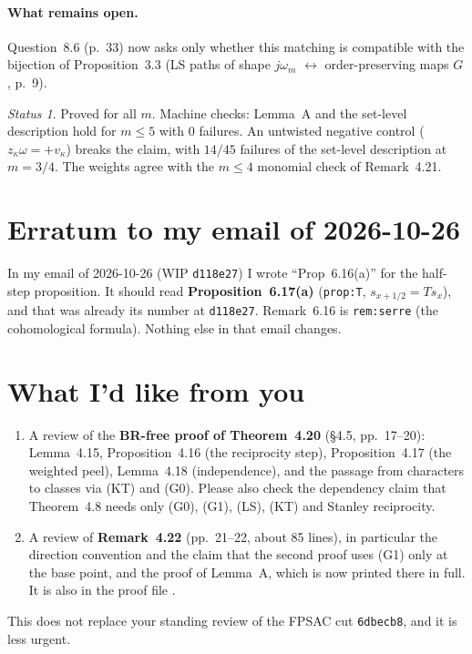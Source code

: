 \documentclass[11pt]{article}
\theoremstyle{plain}
\theoremstyle{remark}
\newtheorem*{status}{Status}
\begin{document}
\paragraph{What remains open.} Question~8.6 (p.~33) now asks only whether this matching is
compatible with the bijection of Proposition~3.3 (LS paths of shape $j\omega_m$ $\leftrightarrow$
order-preserving maps $G$, p.~9).

\begin{status}
Proved for all $m$. Machine checks: Lemma~A and the set-level description hold for $m\le5$ with
$0$ failures. An untwisted negative control ($z_\kappa\omega=+v_\kappa$) breaks the claim, with
$14/45$ failures of the set-level description at $m=3/4$. The weights agree with the $m\le4$
monomial check of Remark~4.21.
\end{status}

\section{Erratum to my email of 2026-10-26}

In my email of 2026-10-26 (WIP \texttt{d118e27}) I wrote ``Prop~6.16(a)'' for the half-step
proposition. It should read \textbf{Proposition~6.17(a)} (\texttt{prop:T},
$s_{x+1/2}=Ts_x$), and that was already its number at \texttt{d118e27}. Remark~6.16 is
\texttt{rem:serre} (the cohomological formula). Nothing else in that email changes.

\section{What I'd like from you}

\begin{enumerate}
\item A review of the \textbf{BR-free proof of Theorem~4.20} (\S4.5, pp.~17--20): Lemma~4.15,
Proposition~4.16 (the reciprocity step), Proposition~4.17 (the weighted peel), Lemma~4.18
(independence), and the passage from characters to classes via (KT) and (G0). Please also check the
dependency claim that Theorem~4.8 needs only (G0), (G1), (LS), (KT) and Stanley reciprocity.
\item A review of \textbf{Remark~4.22} (pp.~21--22, about 85 lines), in particular the direction convention and the claim
that the second proof uses (G1) only at the base point, and the proof of Lemma~A, which is now printed
there in full. It is also in the proof file .
\end{enumerate}
This does not replace your standing review of the FPSAC cut \texttt{6dbecb8}, and it is less urgent.
\end{document}
